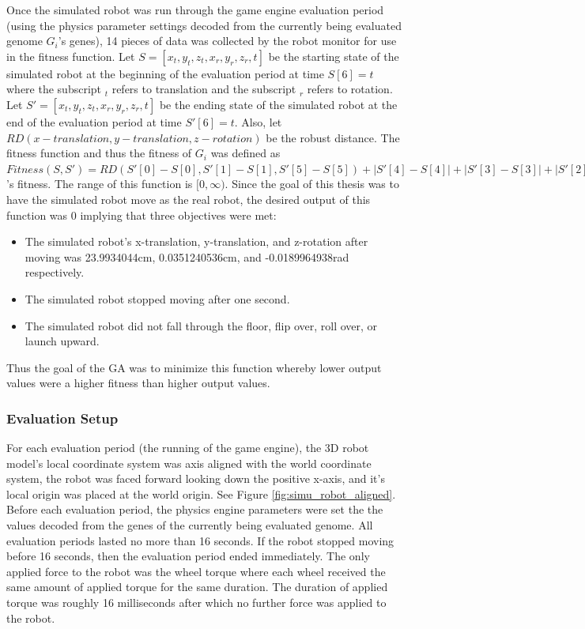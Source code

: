 Once the simulated robot was run through the game engine evaluation period (using the physics parameter settings decoded from the currently being evaluated genome $G_i$'s genes), 14 pieces of data was collected by the robot monitor for use in the fitness function. Let $S=[x_t,y_t,z_t,x_r,y_r,z_r,t]$ be the starting state of the simulated robot at the beginning of the evaluation period at time $S[6]=t$ where the subscript $_t$ refers to translation and the subscript $_r$ refers to rotation. Let $S'=[x_t,y_t,z_t,x_r,y_r,z_r,t]$ be the ending state of the simulated robot at the end of the evaluation period at time $S'[6]=t$. Also, let $RD(x-translation,y-translation,z-rotation)$ be the robust distance. The fitness function and thus the fitness of $G_i$ was defined as $Fitness(S,S')=RD(S'[0]-S[0],S'[1]-S[1],S'[5]-S[5])+|S'[4]-S[4]|+|S'[3]-S[3]|+|S'[2]-S[2]|+((S'[6]-S[6])-1)=G_i$'s fitness. The range of this function is $[0,\infty)$. Since the goal of this thesis was to have the simulated robot move as the real robot, the desired output of this function was $0$ implying that three objectives were met:
\begin{itemize}
 \item The simulated robot's x-translation, y-translation, and z-rotation after moving was 23.9934044cm, 0.0351240536cm, and -0.0189964938rad respectively.
 \item The simulated robot stopped moving after one second.
 \item The simulated robot did not fall through the floor, flip over, roll over, or launch upward.
\end{itemize}
Thus the goal of the GA was to minimize this function whereby lower output values were a higher fitness than higher output values.

\subsubsection{Evaluation Setup}

For each evaluation period (the running of the game engine), the 3D robot model's local coordinate system was axis aligned with the world coordinate system, the robot was faced forward looking down the positive x-axis, and it's local origin was placed at the world origin. See Figure \ref{fig:simu_robot_aligned}. Before each evaluation period, the physics engine parameters were set the the values decoded from the genes of the currently being evaluated genome. All evaluation periods lasted no more than 16 seconds. If the robot stopped moving before 16 seconds, then the evaluation period ended immediately. The only applied force to the robot was the wheel torque where each wheel received the same amount of applied torque for the same duration. The duration of applied torque was roughly 16 milliseconds after which no further force was applied to the robot.

